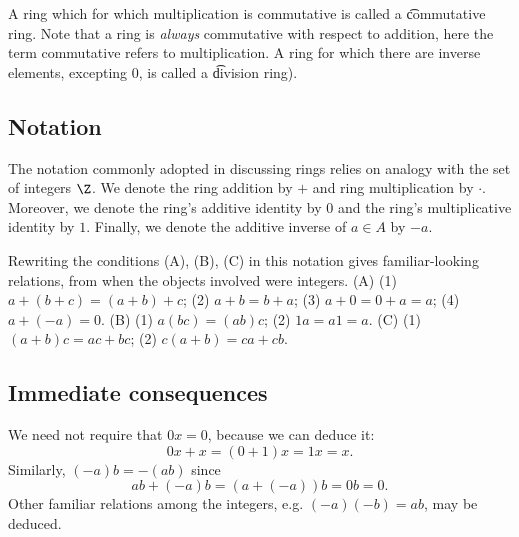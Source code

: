 A ring which for which multiplication is commutative is called a \t{commutative ring}.
Note that a ring is \textit{always} commutative with respect to addition, here the term commutative refers to multiplication.
A ring for which there are inverse elements, excepting 0, is called a \t{division ring}).

\subsection*{Notation}

The notation commonly adopted in discussing rings relies on analogy with the set of integers $\Z $.
We denote the ring addition by $+$ and ring multiplication by $\cdot $.
Moreover, we denote the ring's additive identity by $0$ and the ring's multiplicative identity by $1$.
Finally, we denote the additive inverse of $a \in A$ by $-a$.

Rewriting the conditions (A), (B), (C) in this notation gives familiar-looking relations, from when the objects involved were integers.
(A) (1) $a+(b + c) = (a+b)+c$; (2) $a+b = b+a$; (3) $a + 0 = 0 + a = a$; (4) $a + (-a) = 0$.
(B) (1) $a(bc) = (ab)c$; (2) $1a = a1 = a$.
(C) (1) $(a+b)c = ac + bc$; (2) $c(a+b) = ca + cb$.

\subsection*{Immediate consequences}

We need not require that $0x = 0$, because we can deduce it:
\[
0x + x = (0 + 1)x = 1x = x.
\]
Similarly, $(-a)b = -(ab)$ since
\[
ab + (-a)b = (a + (-a))b = 0b = 0.
\]
Other familiar relations among the integers, e.g. $(-a)(-b) = ab$, may be deduced.
